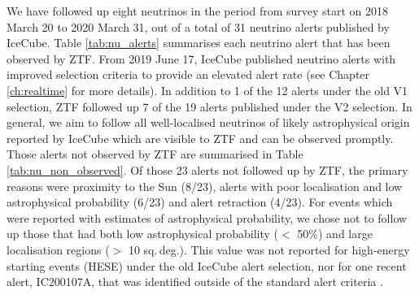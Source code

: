  We have followed up eight neutrinos in the period from survey start on 2018 March 20 to 2020 March 31, out of a total of 31 neutrino alerts published by IceCube. Table \ref{tab:nu_alerts} summarises each neutrino alert that has been observed by ZTF. From 2019 June 17, IceCube published neutrino alerts with improved selection criteria to provide an elevated alert rate  (see Chapter \ref{ch:realtime} for more details). In addition to 1 of the 12 alerts under the old V1 selection, ZTF followed up 7 of the 19 alerts published under the V2 selection. In general, we aim to follow all well-localised neutrinos of likely astrophysical origin reported by IceCube which are visible to ZTF and can be observed promptly. Those alerts not observed by ZTF are summarised in Table \ref{tab:nu_non_observed}. Of those 23 alerts not followed up by ZTF, the primary reasons were proximity to the Sun (8/23), alerts with poor localisation and low astrophysical probability (6/23) and alert retraction (4/23). For events which were reported with estimates of astrophysical probability, we chose not to follow up those that had both low astrophysical probability ($<$ 50\%) and large localisation regions ($>$ 10 sq.\,deg.). This value was not reported for high-energy starting events (HESE) under the old IceCube alert selection, nor for one recent alert, IC200107A, that was identified outside of the standard alert criteria .
 
